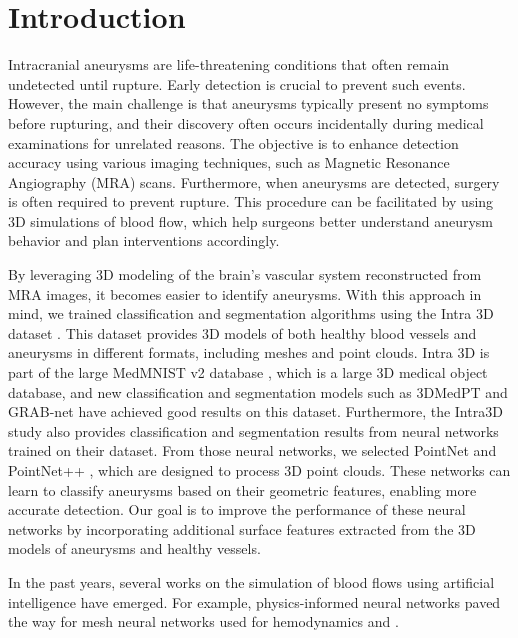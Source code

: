 \documentclass[%
 reprint,
 amsmath,amssymb,
 aps,
 floatfix,
 nofootinbib,
]{revtex4-2}
\begin{document}
\maketitle

\section{Introduction} \label{INTRO}

Intracranial aneurysms are life-threatening conditions that often remain undetected until rupture. Early detection is crucial to prevent such events. However, the main challenge is that aneurysms typically present no symptoms before rupturing, and their discovery often occurs incidentally during medical examinations for unrelated reasons. The objective is to enhance detection accuracy using various imaging techniques, such as Magnetic Resonance Angiography (MRA) scans. Furthermore, when aneurysms are detected, surgery is often required to prevent rupture. This procedure can be facilitated by using 3D simulations of blood flow, which help surgeons better understand aneurysm behavior and plan interventions accordingly.

By leveraging 3D modeling of the brain’s vascular system reconstructed from MRA images, it becomes easier to identify aneurysms. With this approach in mind, we trained classification and segmentation algorithms using the Intra 3D dataset \citep{yang2020intra}. This dataset provides 3D models of both healthy blood vessels and aneurysms in different formats, including meshes and point clouds. Intra 3D is part of the large MedMNIST v2 database \citep{Yang_2023}, which is a large 3D medical object database, and new classification and segmentation models such as 3DMedPT \citep{yu20213dmedicalpointtransformer} and GRAB-net \citep{10093984} have achieved good results on this dataset. Furthermore, the Intra3D study \citep{yang2020intra} also provides classification and segmentation results from neural networks trained on their dataset. From those neural networks, we selected PointNet \citep{pointnet} and PointNet++ \citep{pointnetpp}, which are designed to process 3D point clouds. These networks can learn to classify aneurysms based on their geometric features, enabling more accurate detection. Our goal is to improve the performance of these neural networks by incorporating additional surface features extracted from the 3D models of aneurysms and healthy vessels.

In the past years, several works on the simulation of blood flows using artificial intelligence have emerged. For example, physics-informed neural networks \citep{Arzani_2021} paved the way for mesh neural networks used for hemodynamics \citep{Suk_2024} and \citep{graphphysics}.
\end{document}
